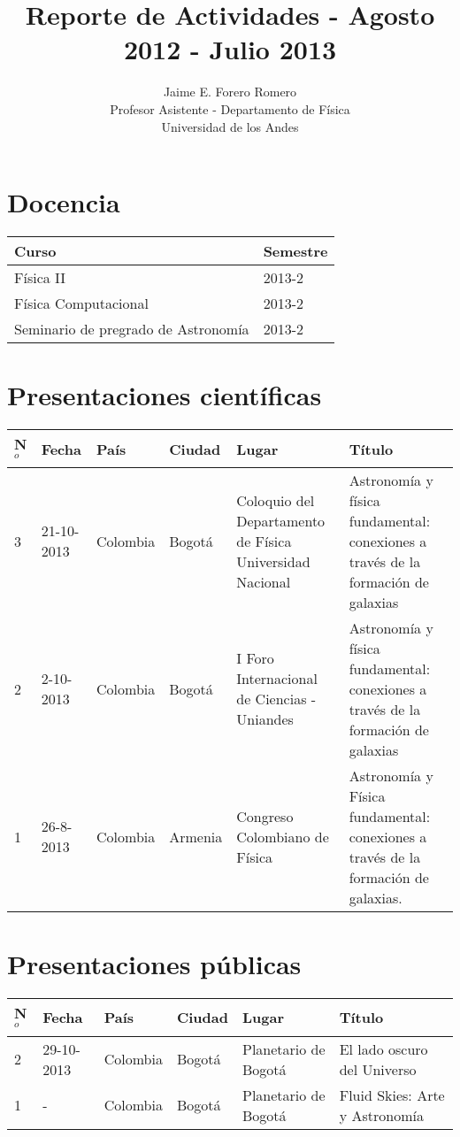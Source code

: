 \documentclass{article}
\title{Reporte de Actividades - Agosto 2012 - Julio 2013}
\author{Jaime E. Forero Romero\\Profesor Asistente - Departamento de
  F\'isica\\Universidad de los Andes}
\begin{document}
\maketitle

\section*{Docencia}

\begin{tabular}{p{7.0cm} p{1.5cm}}\hline
Curso & Semestre\\\hline
F\'isica II & 2013-2 \\
F\'isica Computacional & 2013-2\\
Seminario de pregrado de Astronom\'ia & 2013-2\\\hline
\end{tabular}

\section*{Presentaciones cient\'ificas}

\begin{tabular}{lp{2.0cm} p{1.2cm} p{1.5cm} p{2cm} p{5cm}}\hline
N$^{o}$ & Fecha & Pa\'is & Ciudad & Lugar & T\'itulo \\\hline
3 & 21-10-2013 & Colombia & Bogot\'a & Coloquio del Departamento de F\'isica Universidad Nacional & Astronom\'ia y f\'isica fundamental: conexiones a trav\'es de la formaci\'on de galaxias\\\hline
2 & 2-10-2013 & Colombia & Bogot\'a & I Foro Internacional de Ciencias - Uniandes & Astronom\'ia y f\'isica fundamental: conexiones a trav\'es de la formaci\'on de galaxias\\\hline
1 & 26-8-2013 & Colombia & Armenia & Congreso Colombiano de F\'isica & Astronom\'ia y F\'isica fundamental: conexiones a trav\'es de la formaci\'on de galaxias.\\  \hline
\end{tabular}

\section*{Presentaciones p\'ublicas}

\begin{tabular}{lp{2.0cm} p{1.2cm} p{1.5cm} p{2cm} p{5cm}}\hline
N$^{o}$ & Fecha & Pa\'is & Ciudad & Lugar & T\'itulo\\\hline

2 & 29-10-2013 & Colombia & Bogot\'a & Planetario de Bogot\'a & El lado oscuro del Universo\\ \hline
1 & -& Colombia & Bogot\'a & Planetario de Bogot\'a & Fluid Skies: Arte y Astronom\'ia\\ \hline
\end{tabular}
\end{document}
